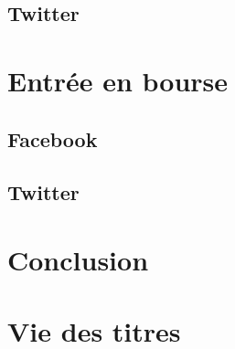 \documentclass[a4paper,10pt]{article}
\begin{document}
\subsection{Twitter}

\section{Entrée en bourse}

\subsection{Facebook}
\subsection{Twitter}

\section{Conclusion}

\section{Vie des titres}


\clearpage
\end{document}
